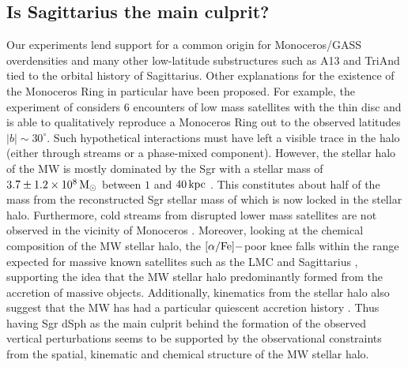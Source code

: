 \documentclass[useAMS,usenatbib]{mnras}
\begin{document}
{\subsection{Is Sagittarius the main culprit?}
Our experiments lend support for a common origin for Monoceros/GASS overdensities and many other low-latitude substructures such as A13 and TriAnd tied to the orbital history of Sagittarius. Other explanations for the existence of the Monoceros Ring in particular have been proposed. For example, the experiment of \cite{kazantzidis08} considers 6 encounters of low mass satellites with the thin disc and is able to qualitatively reproduce a Monoceros Ring out to the observed latitudes $|b|\sim30^{\circ}$. Such hypothetical interactions must have left a visible trace in the halo (either through streams or a phase-mixed component). However, the stellar halo of the MW is mostly dominated by the Sgr with a stellar mass of $3.7\pm1.2\times10^{8} \,\rm{M_{\odot}}$ between $1$ and $40\,\rm{kpc}$ \citep{bell08}. This constitutes about half of the mass from the reconstructed Sgr stellar mass of \cite{ostholt10} which is now locked in the stellar halo. Furthermore, cold streams from disrupted lower mass satellites are not observed in the vicinity of Monoceros \citep{slater14}. Moreover, looking at the chemical composition of the MW stellar halo, the $[\alpha/\rm{Fe}]-$poor knee falls within the range expected for massive known satellites such as the LMC and Sagittarius \citep{deboer14}, supporting the idea that the MW stellar halo predominantly formed from the accretion of massive objects. Additionally, kinematics from the stellar halo also suggest that the MW has had a particular quiescent accretion history \citep{deason17}. Thus having Sgr dSph as the main culprit behind the formation of the observed vertical perturbations seems to be supported by the observational constraints from the spatial, kinematic and chemical structure of the MW stellar halo.

}
\end{document}
